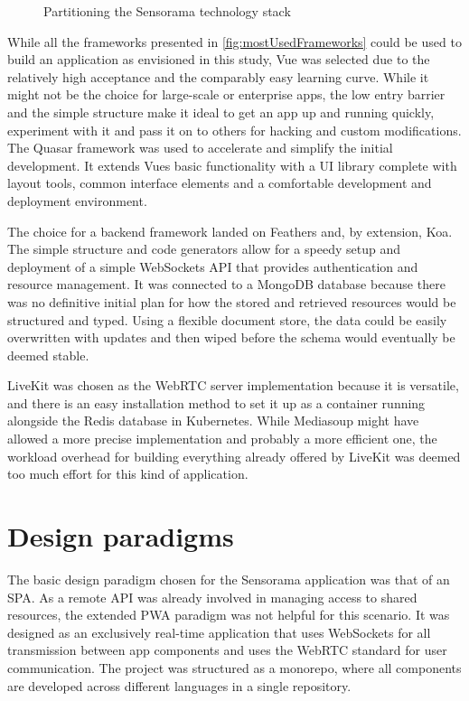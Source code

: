 \begin{figure}[!ht]
\centering

\caption[Sensorama stack diagram]{Partitioning the Sensorama technology stack\protect}
\label{fig:sensoramaStack}
\end{figure}

While all the frameworks presented in \autoref{fig:mostUsedFrameworks} could be used to build an application as envisioned in this study, Vue was selected due to the relatively high acceptance and the comparably easy learning curve.
While it might not be the choice for large-scale or enterprise apps, the low entry barrier and the simple structure make it ideal to get an app up and running quickly, experiment with it and pass it on to others for hacking and custom modifications.
The Quasar framework was used to accelerate and simplify the initial development.
It extends Vue\textquotesingle s basic functionality with a \ac{UI} library complete with layout tools, common interface elements and a comfortable development and deployment environment.

The choice for a backend framework landed on Feathers and, by extension, Koa.
The simple structure and code generators allow for a speedy setup and deployment of a simple WebSockets \ac{API} that provides authentication and resource management.
It was connected to a MongoDB database because there was no definitive initial plan for how the stored and retrieved resources would be structured and typed.
Using a flexible document store, the data could be easily overwritten with updates and then wiped before the schema would eventually be deemed stable.

LiveKit was chosen as the WebRTC server implementation because it is versatile, and there is an easy installation method to set it up as a container running alongside the Redis database in Kubernetes.
While Mediasoup might have allowed a more precise implementation and probably a more efficient one, the workload overhead for building everything already offered by LiveKit was deemed too much effort for this kind of application.

\section{Design paradigms}
\label{sec:design-paradigms}

The basic design paradigm chosen for the Sensorama application was that of an \ac{SPA}.
As a remote API was already involved in managing access to shared resources, the extended \ac{PWA} paradigm was not helpful for this scenario.
It was designed as an exclusively real-time application that uses WebSockets for all transmission between app components and uses the WebRTC standard for user communication.
The project was structured as a monorepo, where all components are developed across different languages in a single repository.

